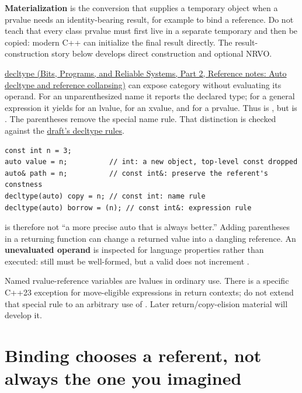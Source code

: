 \textbf{Materialization} is the conversion that supplies a temporary object when a prvalue needs an identity-bearing result, for example to bind a reference. Do not teach that every class prvalue must first live in a separate temporary and then be copied: modern C++ can initialize the final result directly. The result-construction story below develops direct construction and optional NRVO.

\href{../01-Bits-Programs-and-Reliable-Systems-P02/main.pdf\#nameddest=appendix-5d4252a42886}{decltype (Bits, Programs, and Reliable Systems, Part 2, Reference notes: Auto decltype and reference collapsing)} can expose category without evaluating its operand. For an unparenthesized name it reports the declared type; for a general expression it yields  for an lvalue,  for an xvalue, and  for a prvalue. Thus  is , but  is . The parentheses remove the special name rule. That distinction is checked against the \href{https://eel.is/c++draft/dcl.type.decltype}{draft's decltype rules}.

\begin{verbatim}
const int n = 3;
auto value = n;          // int: a new object, top-level const dropped
auto& path = n;          // const int&: preserve the referent's constness
decltype(auto) copy = n; // const int: name rule
decltype(auto) borrow = (n); // const int&: expression rule
\end{verbatim}

 is therefore not ``a more precise auto that is always better.'' Adding parentheses in a returning function can change a returned value into a dangling reference. An \textbf{unevaluated operand} is inspected for language properties rather than executed:  still must be well-formed, but a valid  does not increment .

Named rvalue-reference variables are lvalues in ordinary use. There is a specific C++23 exception for move-eligible expressions in return contexts; do not extend that special rule to an arbitrary use of . Later return/copy-elision material will develop it.

\section{Binding chooses a referent, not always the one you imagined}\label{05-engine-i-ch003-binding-chooses-a-referent-not-always-the-one-you-imagined}

